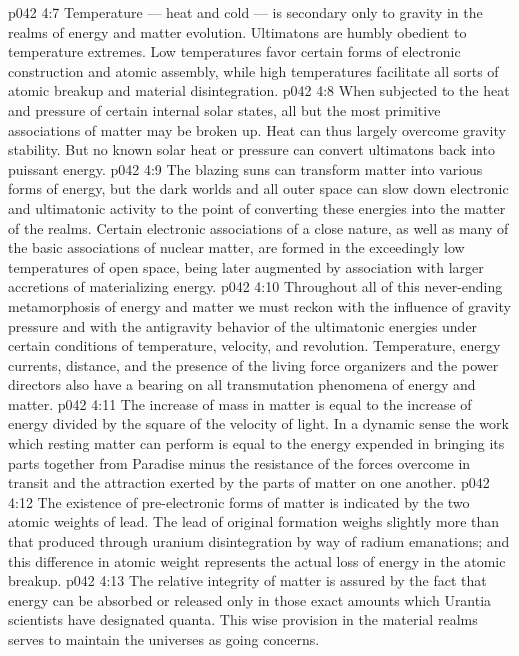 \vs p042 4:7 Temperature --- heat and cold --- is secondary only to gravity in the realms of energy and matter evolution. Ultimatons are humbly obedient to temperature extremes. Low temperatures favor certain forms of electronic construction and atomic assembly, while high temperatures facilitate all sorts of atomic breakup and material disintegration.
\vs p042 4:8 When subjected to the heat and pressure of certain internal solar states, all but the most primitive associations of matter may be broken up. Heat can thus largely overcome gravity stability. But no known solar heat or pressure can convert ultimatons back into puissant energy.
\vs p042 4:9 The blazing suns can transform matter into various forms of energy, but the dark worlds and all outer space can slow down electronic and ultimatonic activity to the point of converting these energies into the matter of the realms. Certain electronic associations of a close nature, as well as many of the basic associations of nuclear matter, are formed in the exceedingly low temperatures of open space, being later augmented by association with larger accretions of materializing energy.
\vs p042 4:10 Throughout all of this never\hyp{}ending metamorphosis of energy and matter we must reckon with the influence of gravity pressure and with the antigravity behavior of the ultimatonic energies under certain conditions of temperature, velocity, and revolution. Temperature, energy currents, distance, and the presence of the living force organizers and the power directors also have a bearing on all transmutation phenomena of energy and matter.
\vs p042 4:11 The increase of mass in matter is equal to the increase of energy divided by the square of the velocity of light. In a dynamic sense the work which resting matter can perform is equal to the energy expended in bringing its parts together from Paradise minus the resistance of the forces overcome in transit and the attraction exerted by the parts of matter on one another.
\vs p042 4:12 \pc The existence of pre\hyp{}electronic forms of matter is indicated by the two atomic weights of lead. The lead of original formation weighs slightly more than that produced through uranium disintegration by way of radium emanations; and this difference in atomic weight represents the actual loss of energy in the atomic breakup.
\vs p042 4:13 \pc The relative integrity of matter is assured by the fact that energy can be absorbed or released only in those exact amounts which Urantia scientists have designated quanta. This wise provision in the material realms serves to maintain the universes as going concerns.
